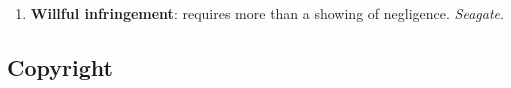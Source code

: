 \begin{enumerate}
\begin{enumerate}
\begin{enumerate}
{            Lock}. Award the patentee's loss, not the infringer's gain.
            \item \emph{Panduit}: the patentee wants to show that would have 
            had sales that the infringer made. To do so, the patentee must 
            show the ``absence of acceptable noninfringing substitutes.''
            \item Reasonable royalty is a fallback when the patentee can't 
            show lost profits---the ``hypothetical bargain'' principle.
        \end{enumerate}
        \item \textbf{Willful infringement}: requires more than a showing of 
        negligence. \emph{Seagate}.
    \end{enumerate}
\end{enumerate}

\newpage

\subsection{Copyright}

